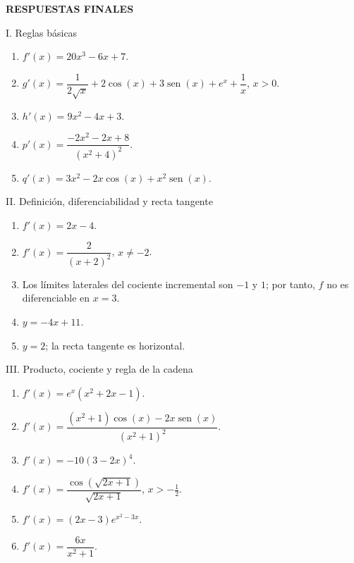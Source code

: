 \documentclass[letterpaper,12pt]{article}
\newcommand{\sen}{\operatorname{sen}}
\begin{document}
\clearpage
\begin{center}
    \begin{tcolorbox}[
        colback=azulFuerte,
        colframe=azulFuerte,
        colupper=white,
        width=0.8\textwidth,
        center,
        arc=10pt]
        \centering\Large\textbf{RESPUESTAS FINALES}
    \end{tcolorbox}
\end{center}

\begin{respuestasbox}{I. Reglas básicas}
\begin{enumerate}[label=\color{azulFuerte}\textbf{\arabic*.},leftmargin=*,itemsep=0.8em]
    \item \(\boxed{f'(x)=20x^3-6x+7}\).
    \item \(\boxed{g'(x)=\dfrac{1}{2\sqrt{x}}+2\cos(x)+3\sen(x)+e^x+\dfrac1x}\), \(x>0\).
    \item \(\boxed{h'(x)=9x^2-4x+3}\).
    \item \(\boxed{p'(x)=\dfrac{-2x^2-2x+8}{(x^2+4)^2}}\).
    \item \(\boxed{q'(x)=3x^2-2x\cos(x)+x^2\sen(x)}\).
\end{enumerate}
\end{respuestasbox}

\begin{respuestasbox}{II. Definición, diferenciabilidad y recta tangente}
\begin{enumerate}[label=\color{azulFuerte}\textbf{\arabic*.},leftmargin=*,start=6,itemsep=0.8em]
    \item \(\boxed{f'(x)=2x-4}\).
    \item \(\boxed{f'(x)=\dfrac{2}{(x+2)^2}}\), \(x\neq-2\).
    \item Los límites laterales del cociente incremental son \(\boxed{-1}\) y \(\boxed{1}\); por tanto, \(f\) no es diferenciable en \(x=3\).
    \item \(\boxed{y=-4x+11}\).
    \item \(\boxed{y=2}\); la recta tangente es horizontal.
\end{enumerate}
\end{respuestasbox}

\begin{respuestasbox}{III. Producto, cociente y regla de la cadena}
\begin{enumerate}[label=\color{azulFuerte}\textbf{\arabic*.},leftmargin=*,start=11,itemsep=0.8em]
    \item \(\boxed{f'(x)=e^x(x^2+2x-1)}\).
    \item \(\boxed{f'(x)=\dfrac{(x^2+1)\cos(x)-2x\sen(x)}{(x^2+1)^2}}\).
    \item \(\boxed{f'(x)=-10(3-2x)^4}\).
    \item \(\boxed{f'(x)=\dfrac{\cos(\sqrt{2x+1})}{\sqrt{2x+1}}}\), \(x>-\tfrac12\).
    \item \(\boxed{f'(x)=(2x-3)e^{x^2-3x}}\).
    \item \(\boxed{f'(x)=\dfrac{6x}{x^2+1}}\).
\end{enumerate}
\end{respuestasbox}
\end{document}
